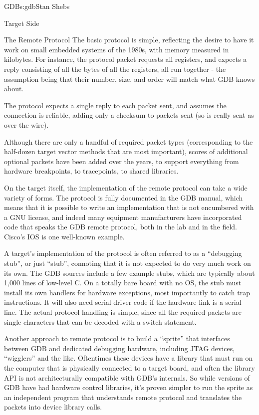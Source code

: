 \begin{aosachapter}{GDB}{s:gdb}{Stan Shebs}
\begin{aosasect1}{Target Side}
\begin{aosasect2}{The Remote Protocol}
The basic protocol is simple, reflecting the desire to have it work on
small embedded systems of the 1980s, with memory measured in
kilobytes.  For instance, the protocol packet  requests all
registers, and expects a reply consisting of all the bytes of all the
registers, all run together - the assumption being that their number,
size, and order will match what GDB knows about.

The protocol expects a single reply to each packet sent, and assumes
the connection is reliable, adding only a checksum to packets sent
(so  is really sent as  over the wire).

Although there are only a handful of required packet types
(corresponding to the half-dozen target vector methods that are most
important), scores of additional optional packets have been added over
the years, to support everything from hardware breakpoints, to
tracepoints, to shared libraries.

On the target itself, the implementation of the remote protocol can
take a wide variety of forms.  The protocol is fully documented in the
GDB manual, which means that it is possible to write an implementation
that is not encumbered with a GNU license, and indeed many equipment
manufacturers have incorporated code that speaks the GDB remote
protocol, both in the lab and in the field.  Cisco's IOS is one
well-known example.

A target's implementation of the protocol is often referred to as a
``debugging stub'', or just ``stub'', connoting that it is not expected
to do very much work on its own.  The GDB sources include a few
example stubs, which are typically about 1,000 lines of low-level C.
On a totally bare board with no OS, the stub must install its own
handlers for hardware exceptions, most importantly to catch trap
instructions.  It will also need serial driver code if the hardware
link is a serial line.  The actual protocol handling is simple, since
all the required packets are single characters that can be decoded
with a switch statement.

Another approach to remote protocol is to build a ``sprite'' that
interfaces between GDB and dedicated debugging hardware, including
JTAG devices, ``wigglers'' and the like.  Oftentimes these devices
have a library that must run on the computer that is physically
connected to a target board, and often the library API is not
architecturally compatible with GDB's internals.  So while versions of
GDB have had hardware control libraries, it's proven simpler to run
the sprite as an independent program that understands remote protocol
and translates the packets into device library calls.


\end{aosasect2}
\end{aosasect1}
\end{aosachapter}
